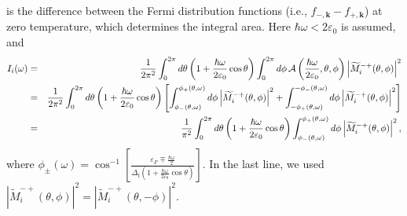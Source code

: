 \documentclass[aps,twocolumn,floatfix]{revtex4-1}
\begin{document}
is the difference between the Fermi distribution functions (i.e., $f_{-,\bm{k}}-f_{+,\bm{k}}$) at zero temperature, which determines the integral area.
Here $\hbar\omega<2\varepsilon_0$ is assumed, and
\begin{eqnarray}
    I_i(\omega)
    &=&
{1\over 2\pi^2}
\int_0^{2\pi} d\theta \left(1+\frac{\hbar\omega}{2\varepsilon_0}\cos{\theta}\right)
\int_{0}^{2\pi} d\phi\,
\mathcal{A}\left(\frac{\hbar\omega}{2\varepsilon_0},\theta,\phi\right)
\left|\widetilde{M}_i^{-+}(\theta,\phi)\right|^2\nonumber\\
&=&
{1\over 2\pi^2}
\int_0^{2\pi} d\theta \left(1+\frac{\hbar\omega}{2\varepsilon_0}\cos{\theta}\right)
\left[\int_{\phi_{-}(\theta,\omega)}^{\phi_{+}(\theta,\omega)} d\phi
\left|\widetilde{M}_i^{-+}(\theta,\phi)\right|^2
+
\int_{-\phi_{+}(\theta,\omega)}^{-\phi_{-}(\theta,\omega)} d\phi
\left|\widetilde{M}_i^{-+}(\theta,\phi)\right|^2
\right]\nonumber\\
&=&
{1\over \pi^2}
\int_0^{2\pi} d\theta \left(1+\frac{\hbar\omega}{2\varepsilon_0}\cos{\theta}\right)
\int_{\phi_{-}(\theta,\omega)}^{\phi_{+}(\theta,\omega)} d\phi
\left|\widetilde{M}_i^{-+}(\theta,\phi)\right|^2,
\end{eqnarray}
where $\phi_\pm(\omega)=\cos^{-1}\left[
\frac{\varepsilon_{F}\mp\frac{\hbar\omega}{2}}
{\Delta_{t}\left(1+\frac{\hbar\omega}{2\varepsilon_0}\cos{\theta}\right)}\right]$. In the last line, we used $\left|\widetilde{M}_i^{-+}(\theta,\phi)\right|^2=\left|\widetilde{M}_i^{-+}(\theta,-\phi)\right|^2$.
\end{document}
